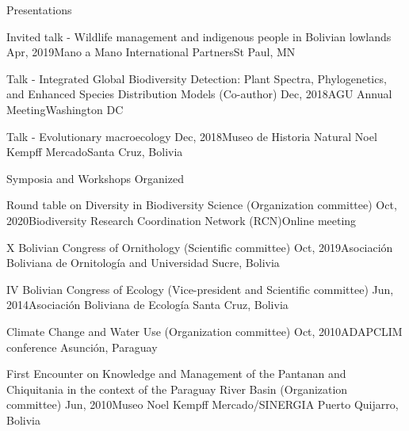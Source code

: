 \documentclass{resume} %
\begin{document}
\begin{rSection}{Presentations}
\begin{sSubsection}{Invited talk - Wildlife management and indigenous people in Bolivian lowlands}{ }{Apr, 2019}{Mano a Mano International Partners}{St Paul, MN}
\end{sSubsection}

\begin{sSubsection}{Talk - Integrated Global Biodiversity Detection: Plant Spectra, Phylogenetics, and Enhanced Species Distribution Models}{ (Co-author) }{Dec, 2018}{AGU Annual Meeting}{Washington DC}
\end{sSubsection}

\begin{sSubsection}{Talk - Evolutionary macroecology}{ }{Dec, 2018}{Museo de Historia Natural Noel Kempff Mercado}{Santa Cruz, Bolivia}
\end{sSubsection}


\end{rSection}

\begin{rSection}{Symposia and Workshops Organized}

\begin{sSubsection}{Round table on Diversity in Biodiversity Science}{ (Organization committee) }{Oct, 2020}{Biodiversity Research Coordination Network (RCN)}{Online meeting}
\end{sSubsection}

\begin{sSubsection}{X Bolivian Congress of Ornithology }{ (Scientific committee) }{Oct, 2019}{Asociación Boliviana de Ornitología and Universidad }{ Sucre, Bolivia}
\end{sSubsection}

\begin{sSubsection}{IV Bolivian Congress of Ecology }{ (Vice-president and Scientific committee) }{Jun, 2014}{Asociación Boliviana de Ecología }{ Santa Cruz, Bolivia}
\end{sSubsection}

\begin{sSubsection}{Climate Change and Water Use }{ (Organization committee) }{Oct, 2010}{ADAPCLIM conference }{ Asunción, Paraguay}
\end{sSubsection}

\begin{sSubsection}{First Encounter on Knowledge and Management of the Pantanan and Chiquitania in the context of the Paraguay River Basin}{ (Organization committee) }{Jun, 2010}{Museo Noel Kempff Mercado/SINERGIA }{ Puerto Quijarro, Bolivia}
\end{sSubsection}

\end{rSection}
\end{document}
